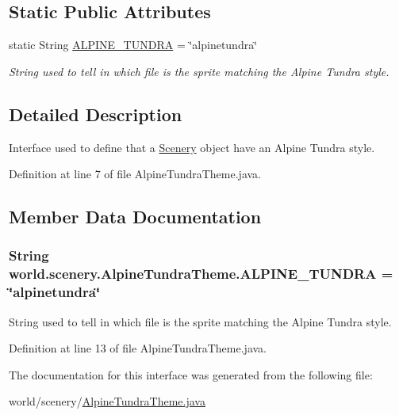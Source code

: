 \subsection*{Static Public Attributes}
\begin{DoxyCompactItemize}
\item 
static String \hyperlink{interfaceworld_1_1scenery_1_1_alpine_tundra_theme_ad3c9b18e312ff348661fc1a42f28f7b6}{A\-L\-P\-I\-N\-E\-\_\-\-T\-U\-N\-D\-R\-A} = \char`\"{}alpinetundra\char`\"{}
\begin{DoxyCompactList}\small\item\em String used to tell in which file is the sprite matching the Alpine Tundra style. \end{DoxyCompactList}\end{DoxyCompactItemize}


\subsection{Detailed Description}
Interface used to define that a \hyperlink{classworld_1_1scenery_1_1_scenery}{Scenery} object have an Alpine Tundra style. 

Definition at line 7 of file Alpine\-Tundra\-Theme.\-java.



\subsection{Member Data Documentation}
\hypertarget{interfaceworld_1_1scenery_1_1_alpine_tundra_theme_ad3c9b18e312ff348661fc1a42f28f7b6}{
\subsubsection[{A\-L\-P\-I\-N\-E\-\_\-\-T\-U\-N\-D\-R\-A}]{\setlength{\rightskip}{0pt plus 5cm}String world.\-scenery.\-Alpine\-Tundra\-Theme.\-A\-L\-P\-I\-N\-E\-\_\-\-T\-U\-N\-D\-R\-A = \char`\"{}alpinetundra\char`\"{}\hspace{0.3cm}{\ttfamily [static]}}}\label{interfaceworld_1_1scenery_1_1_alpine_tundra_theme_ad3c9b18e312ff348661fc1a42f28f7b6}


String used to tell in which file is the sprite matching the Alpine Tundra style. 



Definition at line 13 of file Alpine\-Tundra\-Theme.\-java.



The documentation for this interface was generated from the following file\-:\begin{DoxyCompactItemize}
\item 
world/scenery/\hyperlink{_alpine_tundra_theme_8java}{Alpine\-Tundra\-Theme.\-java}\end{DoxyCompactItemize}

